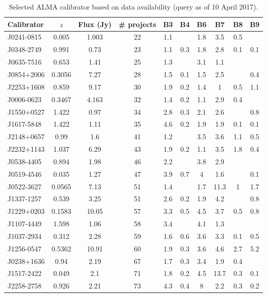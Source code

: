 \begin{table}
\caption{Selected ALMA calibrator based on data availability (query as of 10 April 2017).}
\begin{tabular}{lccccccccc}
\hline
Calibrator & $z$ & Flux (Jy) & \# projects & B3 & B4 & B6 & B7 & B8 & B9 \\
\hline
J0241-0815	&	0.005			&	1.003	&	22	&	1.1	&		&	1.8	&	3.5	&	0.5	&		\\
J0348-2749	&	0.991			&	0.73	&	23	&	1.1	&	0.3	&	1.8	&	2.8	&	0.1	&	0.1	\\
J0635-7516	&	0.653			&	1.41	&	25	&	1.3	&		&	3.1	&	1.1	&		&		\\
J0854+2006	&	0.3056			&	7.27	&	28	&	1.5	&	0.1	&	1.5	&	2.5	&		&	0.4	\\
J2253+1608	&	0.859			&	9.17	&	30	&	1.9	&	0.2	&	1.4	&	1	&	0.5	&	1.1	\\
J0006-0623	&	0.3467			&	4.163	&	32	&	1.4	&	0.2	&	1.1	&	2.9	&	0.4	&		\\
J1550+0527	&	1.422			&	0.97	&	34	&	2.8	&	0.3	&	2.1	&	2.6	&		&	0.8	\\
J1617-5848	&	1.422			&	1.11	&	35	&	4.6	&	0.2	&	1.9	&	1.9	&	0.1	&	0.1	\\
J2148+0657	&	0.99			&	1.6	&	41	&	1.2	&		&	3.5	&	3.6	&	1.1	&	0.5	\\
J2232+1143	&	1.037			&	6.29	&	43	&	1.9	&	0.2	&	1.1	&	3.5	&	1.8	&	0.4	\\
J0538-4405	&	0.894			&	1.98	&	46	&	2.2	&		&	3.8	&	2.9	&		&		\\
J0519-4546	&	0.035			&	1.27	&	47	&	3.9	&	0.7	&	4	&	1.6	&		&	0.1	\\
J0522-3627	&	0.0565			&	7.13	&	51	&	1.4	&		&	1.7	&	11.3	&	1	&	1.7	\\
J1337-1257	&	0.539			&	3.25	&	51	&	2.6	&	0.2	&	1.9	&	4.2	&		&	0.8	\\
J1229+0203	&	0.1583			&	10.05	&	57	&	3.3	&	0.5	&	4.5	&	3.7	&	0.5	&	0.8	\\
J1107-4449	&	1.598			&	1.06	&	58	&	3.4	&		&	4.1	&	1.3	&		&		\\
J1037-2934	&	0.312			&	2.28	&	59	&	1.6	&	0.6	&	3.6	&	3.3	&	0.1	&	0.5	\\
J1256-0547	&	0.5362			&	10.91	&	60	&	1.9	&	0.3	&	3.6	&	4.6	&	2.7	&	5.2	\\
J0238+1636	&	0.94			&	2.19	&	67	&	1.7	&	0.3	&	3.4	&	1.9	&	0.4	&		\\
J1517-2422	&	0.049			&	2.1	&	71	&	1.8	&	0.2	&	4.5	&	13.7	&	0.3	&	0.1	\\
J2258-2758	&	0.926			&	2.21	&	73	&	4.3	&	0.4	&	8	&	2.2	&	0.3	&	0.2	\\

\end{tabular}
\end{table}
